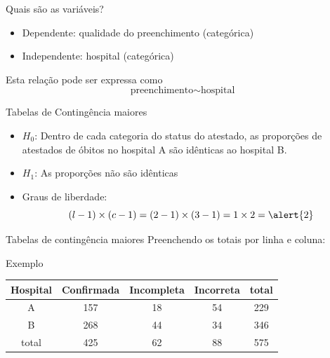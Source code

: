 \documentclass{beamer}
\begin{document}
\begin{frame}{Quais são as variáveis?}
  \begin{itemize}
    \small
  \item Dependente: qualidade do preenchimento (categórica)
  \item Independente: hospital (categórica)
  \end{itemize}
  \vfill
  \begin{block}{Esta relação pode ser expressa como}
    \begin{displaymath}
      \text{preenchimento} \sim \text{hospital}
    \end{displaymath}
  \end{block}
\end{frame}

\begin{frame}{Tabelas de Contingência maiores}
  \begin{itemize}
  \item $H_0$: Dentro de cada categoria do status do atestado, as
    proporções de atestados de óbitos no hospital A são idênticas ao
    hospital B.
  \item $H_1$: As proporções não são idênticas
  \item Graus de liberdade:
    \begin{displaymath}
      (l -1)\times (c-1) = (2-1) \times (3-1)
      = 1 \times 2 = \alert{2}
    \end{displaymath}
  \end{itemize}
\end{frame}

\begin{frame}{Tabelas de contingência maiores}
  Preenchendo os totais por linha e coluna:
  \begin{exampleblock}{Exemplo}
    \begin{tabular}{c|c|c|c|c}
      Hospital & Confirmada & Incompleta &
      Incorreta & total\\
      \hline
      A & 157 & 18 & 54 & 229\\
      \hline
      B & 268 & 44 & 34 & 346\\
      \hline
      total & 425 & 62 & 88 & 575\\
    \end{tabular}
  \end{exampleblock}
\end{frame}
\end{document}
